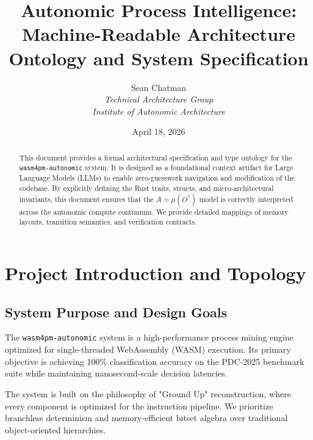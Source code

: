\documentclass[12pt,a4paper]{report}
\title{\textbf{Autonomic Process Intelligence: \\ Machine-Readable Architecture Ontology and System Specification}}
\author{Sean Chatman \\ \textit{Technical Architecture Group} \\ \textit{Institute of Autonomic Architecture}}
\date{April 18, 2026}
\begin{document}
\maketitle

\begin{abstract}
This document provides a formal architectural specification and type ontology for the \texttt{wasm4pm-autonomic} system. It is designed as a foundational context artifact for Large Language Models (LLMs) to enable zero-guesswork navigation and modification of the codebase. By explicitly defining the Rust traits, structs, and micro-architectural invariants, this document ensures that the $A = \mu(O^*)$ model is correctly interpreted across the autonomic compute continuum. We provide detailed mappings of memory layouts, transition semantics, and verification contracts.
\end{abstract}

\tableofcontents

\chapter{Project Introduction and Topology}
\section{System Purpose and Design Goals}
The \texttt{wasm4pm-autonomic} system is a high-performance process mining engine optimized for single-threaded WebAssembly (WASM) execution. Its primary objective is achieving 100\% classification accuracy on the PDC-2025 benchmark suite while maintaining nanosecond-scale decision latencies. 

The system is built on the philosophy of "Ground Up" reconstruction, where every component is optimized for the instruction pipeline. We prioritize branchless determinism and memory-efficient bitset algebra over traditional object-oriented hierarchies.
\end{document}
